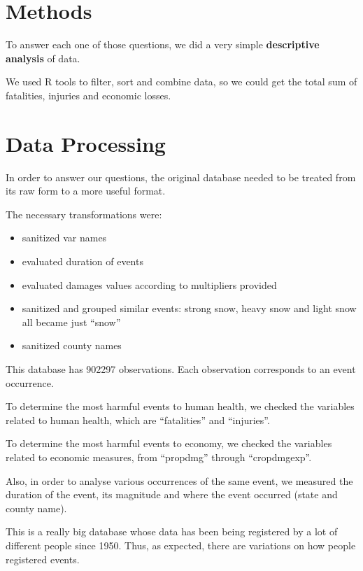 \documentclass[]{article}
\providecommand{\tightlist}{%
  \setlength{\itemsep}{0pt}\setlength{\parskip}{0pt}}
\begin{document}
\section{Methods}\label{methods}

To answer each one of those questions, we did a very simple
\textbf{descriptive analysis} of data.

We used R tools to filter, sort and combine data, so we could get the
total sum of fatalities, injuries and economic losses.

\section{Data Processing}\label{data-processing}

In order to answer our questions, the original database needed to be
treated from its raw form to a more useful format.

The necessary transformations were:

\begin{itemize}
\tightlist
\item
  sanitized var names
\item
  evaluated duration of events
\item
  evaluated damages values according to multipliers provided
\item
  sanitized and grouped similar events: strong snow, heavy snow and
  light snow all became just ``snow''
\item
  sanitized county names
\end{itemize}

This database has 902297 observations. Each observation corresponds to
an event occurrence.

To determine the most harmful events to human health, we checked the
variables related to human health, which are ``fatalities'' and
``injuries''.

To determine the most harmful events to economy, we checked the
variables related to economic measures, from ``propdmg'' through
``cropdmgexp''.

Also, in order to analyse various occurrences of the same event, we
measured the duration of the event, its magnitude and where the event
occurred (state and county name).

This is a really big database whose data has been being registered by a
lot of different people since 1950. Thus, as expected, there are
variations on how people registered events.
\end{document}
